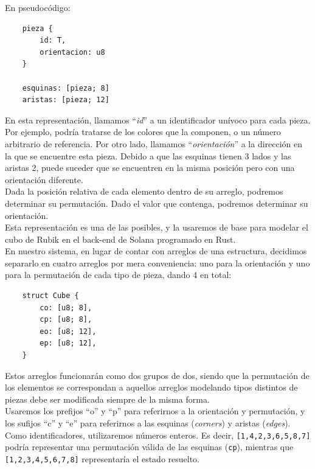 \begin{multicols}{2}
En pseudocódigo:

\begin{verbatim}
    pieza {
        id: T,
        orientacion: u8
    }

    esquinas: [pieza; 8]
    aristas: [pieza; 12]
\end{verbatim}

En esta representación, llamamos ``\textit{id}'' a un identificador unívoco para cada pieza. Por ejemplo, podría tratarse de los colores que la componen, o un número arbitrario de referencia.
Por otro lado, llamamos ``\textit{orientación}'' a la dirección en la que se encuentre esta pieza. Debido a que las esquinas tienen 3 lados y las aristas 2, puede suceder que se encuentren en la misma posición pero con una orientación diferente.\\

Dada la posición relativa de cada elemento dentro de su arreglo, podremos determinar su permutación. Dado el valor que contenga, podremos determinar su orientación.\\

Esta representación es una de las posibles, y la usaremos de base para modelar el cubo de Rubik en el back-end de Solana programado en Rust\cite{rust}.\\

En nuestro sistema, en lugar de contar con arreglos de una estructura, decidimos separarlo en cuatro arreglos por mera conveniencia: uno para la orientación y uno para la permutación de cada tipo de pieza, dando 4 en total:

\begin{verbatim}
    struct Cube {
        co: [u8; 8],
        cp: [u8; 8],
        eo: [u8; 12],
        ep: [u8; 12],
    }
\end{verbatim}

Estos arreglos funcionarán como dos grupos de dos, siendo que la permutación de los elementos se correspondan a aquellos arreglos modelando tipos distintos de piezas debe ser modificada siempre de la misma forma.\\

Usaremos los prefijos ``o'' y ``p'' para referirnos a la orientación y permutación, y los sufijos ``c'' y ``e'' para referirnos a las esquinas (\textit{corners}) y aristas (\textit{edges}).\\

Como identificadores, utilizaremos números enteros. Es decir, \texttt{[1,4,2,3,6,5,8,7]} podría representar una permutación válida de las esquinas (\texttt{cp}), mientras que \texttt{[1,2,3,4,5,6,7,8]} representaría el estado resuelto.\\


\end{multicols}
